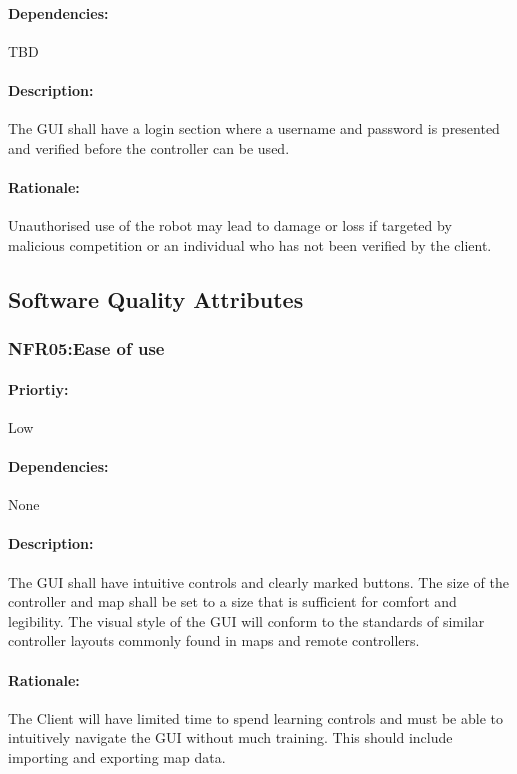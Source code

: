 \documentclass[10pt,a4paper,titlepage]{article}
\begin{document}
	\paragraph{Dependencies:}TBD
	\paragraph {Description:} The GUI shall have a login section where a username and password is presented and verified before the controller can be used.\\
	\paragraph{Rationale:} Unauthorised use of the robot may lead to damage or loss if targeted by malicious competition or an individual who has not been verified by the client.\\
	
	\subsection{Software Quality Attributes}
	
	\subsubsection*{NFR05:Ease of use}
	\paragraph{Priortiy:} Low
	\paragraph{Dependencies:} None
	\paragraph {Description:} The GUI shall have intuitive controls and clearly marked buttons. The size of the controller and map shall be set to a size that is sufficient for comfort and legibility. The visual style of the GUI will conform to the standards of similar controller layouts commonly found in maps and remote controllers.\\
	\paragraph {Rationale:} The Client will have limited time to spend learning controls and must be able to intuitively navigate the GUI without much training. This should include importing and exporting map data.\\
	
\end{document}
